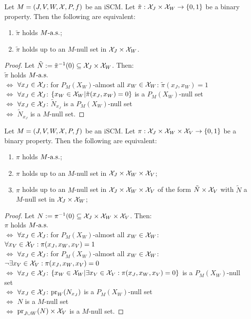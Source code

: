 \begin{Lem}
  Let $M = \left ( J, V, W, \mathcal{X}, P, f \right )$ be an iSCM.
  Let $\tilde\pi : \mathcal{X}_J \times \mathcal{X}_W \to \{0,1\}$ be a binary property.
  Then the following are equivalent:
  \begin{enumerate}
    \item $\tilde\pi$ holds $M\text{-a.s.}$;
    \item $\tilde\pi$ holds up to an $M$-null set in $\mathcal{X}_J \times \mathcal{X}_W$.
  \end{enumerate}
\end{Lem}
\begin{proof}
  Let $\tilde N := \tilde\pi^{-1}(0) \subseteq \mathcal{X}_J \times \mathcal{X}_W$. Then:\\

  \noindent\phantom{$\iff$} $\tilde\pi$ holds $M\text{-a.s.}$ \\
  $\iff$ $\forall x_J \in \mathcal{X}_J$: for $P_M(X_W)$-almost all $x_W \in \mathcal{X}_W$: \quad $\tilde\pi(x_J,x_W) = 1$\\
  $\iff$ $\forall x_J \in \mathcal{X}_J$: $\{x_W \in \mathcal{X}_W | \tilde\pi(x_J,x_W) = 0\}$ is a $P_M(X_W)$-null set\\
  $\iff$ $\forall x_J \in \mathcal{X}_J$: ${\tilde N}_{x_J}$ is a $P_M(X_W)$-null set\\
  $\iff$ ${\tilde N}_{x_J}$ is a $M$-null set.
\end{proof}
\begin{Lem}
  Let $M = \left ( J, V, W, \mathcal{X}, P, f \right )$ be an iSCM.
  Let $\pi : \mathcal{X}_J \times \mathcal{X}_W \times \mathcal{X}_V \to \{0,1\}$ be a binary property.
  Then the following are equivalent:
  \begin{enumerate}
    \item $\pi$ holds $M\text{-a.s.}$;
    \item $\pi$ holds up to an $M$-null set in $\mathcal{X}_J \times \mathcal{X}_W \times \mathcal{X}_V$;
    \item $\pi$ holds up to an $M$-null set in $\mathcal{X}_J \times \mathcal{X}_W \times \mathcal{X}_V$ of the form $\tilde{N} \times \mathcal{X}_V$ with $\tilde{N}$ a $M$-null set in $\mathcal{X}_J \times \mathcal{X}_W$;
  \end{enumerate}
\end{Lem}
\begin{proof}
  Let $N := \pi^{-1}(0) \subseteq \mathcal{X}_J \times \mathcal{X}_W \times \mathcal{X}_V$. Then:\\

  \noindent\phantom{$\iff$} $\pi$ holds $M\text{-a.s.}$ \\
  $\iff$ $\forall x_J \in \mathcal{X}_J$: for $P_M(X_W)$-almost all $x_W \in \mathcal{X}_W$: $\forall x_V \in \mathcal{X}_V: \pi(x_J,x_W,x_V) = 1$\\
  $\iff$ $\forall x_J \in \mathcal{X}_J$: for $P_M(X_W)$-almost all $x_W \in \mathcal{X}_W$: $\lnot \exists x_V \in \mathcal{X}_V : \pi(x_J,x_W,x_V) = 0$\\
  $\iff$ $\forall x_J \in \mathcal{X}_J$: $\{x_W \in \mathcal{X}_W | \exists x_V \in \mathcal{X}_V : \pi(x_J,x_W,x_V) = 0\}$ is a $P_M(X_W)$-null set\\
  $\iff$ $\forall x_J \in \mathcal{X}_J$: $\mathrm{pr}_W(N_{x_J})$ is a $P_M(X_W)$-null set\\
  $\iff$ $N$ is a $M$-null set\\
  $\iff$ $\mathrm{pr}_{J\cup W}(N) \times \mathcal{X}_V$ is a $M$-null set.
\end{proof}

